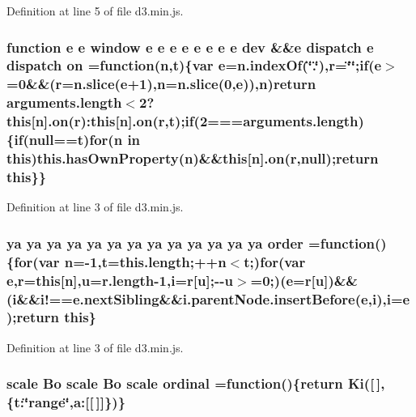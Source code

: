 Definition at line 5 of file d3.\+min.\+js.

\subsubsection[{on}]{\setlength{\rightskip}{0pt plus 5cm}function {\bf e} {\bf e} {\bf window} {\bf e} {\bf e} {\bf e} {\bf e} {\bf e} {\bf e} {\bf e} {\bf e} {\bf dev} \&\&{\bf e} {\bf dispatch} {\bf e} {\bf dispatch} on =function({\bf n},t)\{var {\bf e}=n.\+index\+Of(\char`\"{}.\char`\"{}),{\bf r}=\char`\"{}\char`\"{};{\bf if}({\bf e}$>$=0\&\&({\bf r}=n.\+slice({\bf e}+1),{\bf n}=n.\+slice(0,{\bf e})),{\bf n}){\bf return} arguments.\+length$<$2?{\bf this}[{\bf n}].on({\bf r})\+:{\bf this}[{\bf n}].on({\bf r},t);{\bf if}(2===arguments.\+length)\{{\bf if}(null==t){\bf for}({\bf n} in {\bf this})this.\+has\+Own\+Property({\bf n})\&\&{\bf this}[{\bf n}].on({\bf r},null);{\bf return} {\bf this}\}\}}\label{d3_8min_8js_aae0f8cd9767e21b3d0ffa85239a16dd3}


Definition at line 3 of file d3.\+min.\+js.

\subsubsection[{order}]{ {\bf ya} {\bf ya} {\bf ya} {\bf ya} {\bf ya} {\bf ya} {\bf ya} {\bf ya} {\bf ya} {\bf ya} {\bf ya} {\bf ya} {\bf ya} order =function()\{{\bf for}(var {\bf n}=-\/1,t=this.\+length;++{\bf n}$<$t;){\bf for}(var {\bf e},{\bf r}={\bf this}[{\bf n}],u=r.\+length-\/1,{\bf i}={\bf r}[u];-\/-\/u$>$=0;)({\bf e}={\bf r}[u])\&\&({\bf i}\&\&i!==e.\+next\+Sibling\&\&i.\+parent\+Node.\+insert\+Before({\bf e},{\bf i}),{\bf i}={\bf e});{\bf return} {\bf this}\}}\label{d3_8min_8js_aa9ebb1400540c79c1b7d65a6bbe1b097}


Definition at line 3 of file d3.\+min.\+js.

\subsubsection[{ordinal}]{ {\bf scale} {\bf Bo} {\bf scale} {\bf Bo} {\bf scale} ordinal =function()\{{\bf return} {\bf Ki}([$\,$],\{t\+:\char`\"{}range\char`\"{},a\+:[[$\,$]]\})\}}\label{d3_8min_8js_a70f1654234ac4c77da73b4f86370901d}


